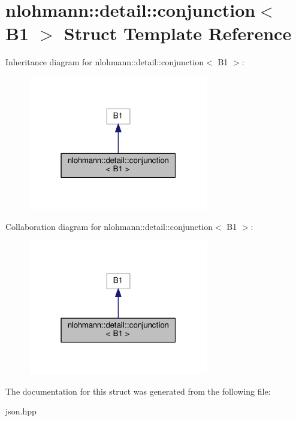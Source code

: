\hypertarget{structnlohmann_1_1detail_1_1conjunction_3_01B1_01_4}{}\section{nlohmann\+:\+:detail\+:\+:conjunction$<$ B1 $>$ Struct Template Reference}
\label{structnlohmann_1_1detail_1_1conjunction_3_01B1_01_4}


Inheritance diagram for nlohmann\+:\+:detail\+:\+:conjunction$<$ B1 $>$\+:
\nopagebreak
\begin{figure}[H]
\begin{center}
\leavevmode
\includegraphics[width=223pt]{structnlohmann_1_1detail_1_1conjunction_3_01B1_01_4__inherit__graph}
\end{center}
\end{figure}


Collaboration diagram for nlohmann\+:\+:detail\+:\+:conjunction$<$ B1 $>$\+:
\nopagebreak
\begin{figure}[H]
\begin{center}
\leavevmode
\includegraphics[width=223pt]{structnlohmann_1_1detail_1_1conjunction_3_01B1_01_4__coll__graph}
\end{center}
\end{figure}


The documentation for this struct was generated from the following file\+:\begin{DoxyCompactItemize}
\item 
json.\+hpp\end{DoxyCompactItemize}
